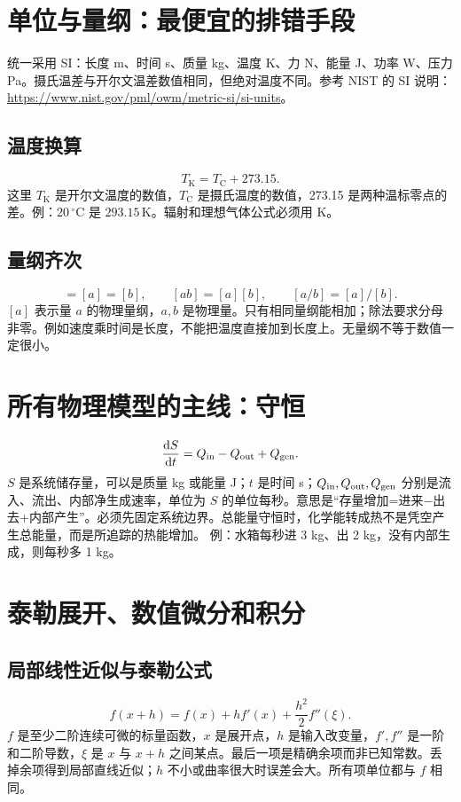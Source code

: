 \section{单位与量纲：最便宜的排错手段}
统一采用 SI：长度 m、时间 s、质量 kg、温度 K、力 N、能量 J、功率 W、压力 Pa。摄氏温差与开尔文温差数值相同，但绝对温度不同。参考 NIST 的 SI 说明：\url{https://www.nist.gov/pml/owm/metric-si/si-units}。
\subsection{温度换算}
\begin{equation}T_{\mathrm K}=T_{\mathrm C}+273.15.\end{equation}
这里 $T_{\mathrm K}$ 是开尔文温度的数值，$T_{\mathrm C}$ 是摄氏温度的数值，273.15 是两种温标零点的差。例：$20\,^{\circ}\mathrm C$ 是 $293.15\,\mathrm K$。辐射和理想气体公式必须用 K。
\subsection{量纲齐次}
\begin{equation}[a+b]=[a]=[b],\qquad [ab]=[a][b],\qquad [a/b]=[a]/[b].\end{equation}
$[a]$ 表示量 $a$ 的物理量纲，$a,b$ 是物理量。只有相同量纲能相加；除法要求分母非零。例如速度乘时间是长度，不能把温度直接加到长度上。无量纲不等于数值一定很小。

\section{所有物理模型的主线：守恒}
\begin{equation}\frac{\mathrm d S}{\mathrm dt}=Q_{\rm in}-Q_{\rm out}+Q_{\rm gen}.\end{equation}
$S$ 是系统储存量，可以是质量 kg 或能量 J；$t$ 是时间 s；$Q_{\rm in},Q_{\rm out},Q_{\rm gen}$ 分别是流入、流出、内部净生成速率，单位为 $S$ 的单位每秒。意思是“存量增加=进来−出去+内部产生”。必须先固定系统边界。总能量守恒时，化学能转成热不是凭空产生总能量，而是所追踪的热能增加。
例：水箱每秒进 3 kg、出 2 kg，没有内部生成，则每秒多 1 kg。

\section{泰勒展开、数值微分和积分}
\subsection{局部线性近似与泰勒公式}
\begin{equation}f(x+h)=f(x)+hf'(x)+\frac{h^2}{2}f''(\xi).\end{equation}
$f$ 是至少二阶连续可微的标量函数，$x$ 是展开点，$h$ 是输入改变量，$f',f''$ 是一阶和二阶导数，$\xi$ 是 $x$ 与 $x+h$ 之间某点。最后一项是精确余项而非已知常数。丢掉余项得到局部直线近似；$h$ 不小或曲率很大时误差会大。所有项单位都与 $f$ 相同。
